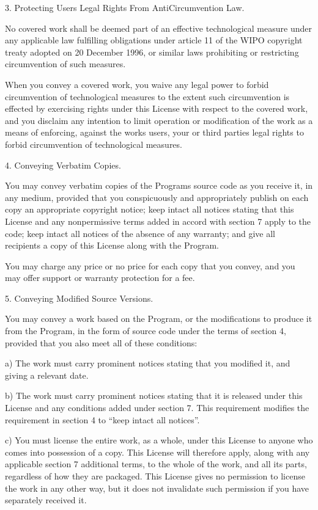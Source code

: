 \documentclass[letterpaper,10pt,english]{sphinxmanual}
\begin{document}
\begin{sphinxVerbatim}[commandchars=\\\{\}]
 3. Protecting Users\PYGZsq{} Legal Rights From Anti\PYGZhy{}Circumvention Law.

   No covered work shall be deemed part of an effective technological measure
   under any applicable law fulfilling obligations under article 11 of the WIPO
   copyright treaty adopted on 20 December 1996, or similar laws prohibiting or
   restricting circumvention of such measures.

   When you convey a covered work, you waive any legal power to forbid
   circumvention of technological measures to the extent such circumvention is
   effected by exercising rights under this License with respect to the covered
   work, and you disclaim any intention to limit operation or modification of
   the work as a means of enforcing, against the work\PYGZsq{}s users, your or third
   parties\PYGZsq{} legal rights to forbid circumvention of technological measures.

 4. Conveying Verbatim Copies.

   You may convey verbatim copies of the Program\PYGZsq{}s source code as you receive
   it, in any medium, provided that you conspicuously and appropriately publish
   on each copy an appropriate copyright notice; keep intact all notices
   stating that this License and any non\PYGZhy{}permissive terms added in accord with
   section 7 apply to the code; keep intact all notices of the absence of any
   warranty; and give all recipients a copy of this License along with the
   Program.

   You may charge any price or no price for each copy that you convey, and you
   may offer support or warranty protection for a fee.

 5. Conveying Modified Source Versions.

   You may convey a work based on the Program, or the modifications to produce
   it from the Program, in the form of source code under the terms of section
   4, provided that you also meet all of these conditions:

   a) The work must carry prominent notices stating that you modified it, and
      giving a relevant date.

   b) The work must carry prominent notices stating that it is released under
      this License and any conditions added under section 7. This requirement
      modifies the requirement in section 4 to “keep intact all notices”.

   c) You must license the entire work, as a whole, under this License to
      anyone who comes into possession of a copy. This License will therefore
      apply, along with any applicable section 7 additional terms, to the whole
      of the work, and all its parts, regardless of how they are packaged. This
      License gives no permission to license the work in any other way, but it
      does not invalidate such permission if you have separately received it.


\end{sphinxVerbatim}
\end{document}
